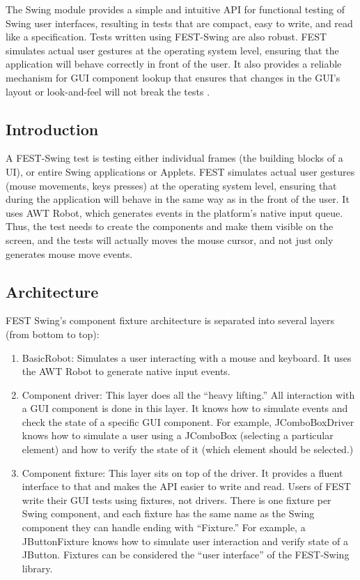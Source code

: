 The Swing module provides a simple and intuitive API for functional testing of Swing user interfaces, resulting in tests that are compact, easy to write, and read like a specification. Tests written using FEST-Swing are also robust. FEST simulates actual user gestures at the operating system level, ensuring that the application will behave correctly in front of the user. It also provides a reliable mechanism for GUI component lookup that ensures that changes in the GUI's layout or look-and-feel will not break the tests \cite{FESTMain}.

\subsection{Introduction}

A FEST-Swing test is testing either individual frames (the building blocks of a UI), or entire Swing applications or Applets. FEST simulates actual user gestures (mouse movements, keys presses) at the operating system level, ensuring that during the application will behave in the same way as in the front of the user. It uses AWT Robot, which generates events in the platform's native input queue. Thus, the test needs to create the components and make them visible on the screen, and the tests will actually moves the mouse cursor, and not just only generates mouse move events.

\subsection{Architecture}

FEST Swing's component fixture architecture is separated into several layers (from bottom to top):
\begin{enumerate}
\item BasicRobot: Simulates a user interacting with a mouse and keyboard. It uses the AWT Robot to generate native input events.
\item Component driver: This layer does all the ``heavy lifting.'' All interaction with a GUI component is done in this layer. It knows how to simulate events and check the state of a specific GUI component. For example, JComboBoxDriver knows how to simulate a user using a JComboBox (selecting a particular element) and how to verify the state of it (which element should be selected.)
\item Component fixture: This layer sits on top of the driver. It provides a fluent interface to that and makes the API easier to write and read. Users of FEST write their GUI tests using fixtures, not drivers. There is one fixture per Swing component, and each fixture has the same name as the Swing component they can handle ending with ``Fixture.'' For example, a JButtonFixture knows how to simulate user interaction and verify state of a JButton. Fixtures can be considered the ``user interface'' of the FEST-Swing library.
\end{enumerate}

